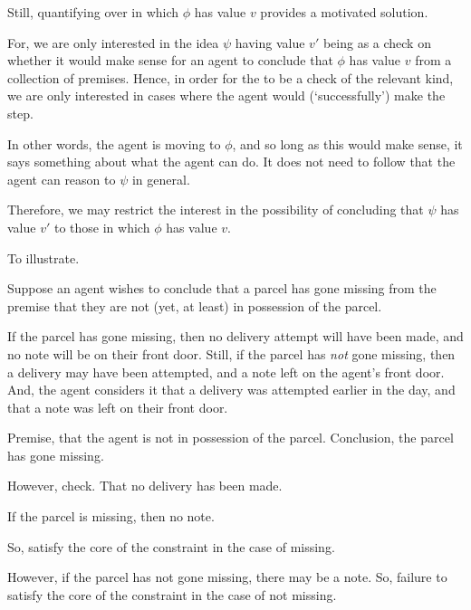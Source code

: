 \begin{note}[Solution]
  \color{red}
  Still, quantifying over  in which \(\phi\) has value \(v\) provides a motivated solution.

  For, we are only interested in the idea \(\psi\) having value \(v'\) being \crequ{} as a check on whether it would make sense for an agent to conclude that \(\phi\) has value \(v\) from a collection of premises.
  Hence, in order for the \crequ{} to be a check of the relevant kind, we are only interested in cases where the agent would (`successfully') make the step.

  In other words, the agent is moving to \(\phi\), and so long as this would make sense, it says something about what the agent can do.
  It does not need to follow that the agent can reason to \(\psi\) in general.

  Therefore, we may restrict the interest in the possibility of concluding that \(\psi\) has value \(v'\) to those  in which \(\phi\) has value \(v\).
\end{note}

\begin{note}[Illustration]
  To illustrate.

  \begin{illustration}
    Suppose an agent wishes to conclude that a parcel has gone missing from the premise that they are not (yet, at least) in possession of the parcel.

    If the parcel has gone missing, then no delivery attempt will have been made, and no note will be on their front door.
    Still, if the parcel has \emph{not} gone missing, then a delivery may have been attempted, and a note left on the agent's front door.
    And, the agent considers it \epVAd{} that a delivery was attempted earlier in the day, and that a note was left on their front door.
  \end{illustration}

  Premise, that the agent is not in possession of the parcel.
  Conclusion, the parcel has gone missing.

  However, check.
  That no delivery has been made.

  If the parcel is missing, then no note.

  So, satisfy the core of the constraint in the case of missing.

  However, if the parcel has not gone missing, there may be a note.
  So, failure to satisfy the core of the constraint in the case of not missing.
\end{note}

